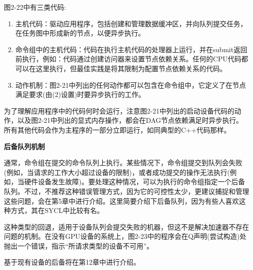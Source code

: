 图2-22中有三类代码:\par

\begin{enumerate}
	\item 主机代码：驱动应用程序，包括创建和管理数据缓冲区，并向队列提交任务，在任务图中形成新的节点，以便异步执行。
	\item 命令组中的主机代码：代码在执行主机代码的处理器上运行，并在submit返回前执行，例如：代码通过创建访问器来设置节点依赖关系。任何的CPU代码都可以在这里执行，但最佳实践是将其限制为配置节点依赖关系的代码。
	\item 动作机制：图2-21中列出的任何动作都可以包含在命令组中，它定义了在节点满足要求(由(2)设置)时要异步执行的工作。
\end{enumerate}

为了理解应用程序中的代码何时会运行，注意图2-21中列出的启动设备代码的动作，以及图2-21中列出的显式内存操作，都会在DAG节点依赖满足时异步执行。所有其他代码会作为主程序的一部分立即运行，如同典型的C++代码那样。\par

\hspace*{\fill} \par %
\textbf{后备队列机制}

通常，命令组在提交的命令队列上执行。某些情况下，命令组提交到队列会失败(例如，当请求的工作大小超过设备的限制)，或者成功提交的操作无法执行(例如，当硬件设备发生故障)。要处理这种情况，可以为执行的命令组指定一个后备队列。不过，不推荐这种错误管理方式，因为它的可控性太少，更建议捕捉和管理这些问题，会在第5章中进行介绍。这里简要介绍下后备队列，因为有些人喜欢这种方式，其在SYCL中比较有名。\par

这种类型的回退，适用于设备队列会提交失败的机器，但这不是解决加速器不存在问题的机制。在没有GPU设备的系统上，图2-23中的程序会在Q声明(尝试构造)处抛出一个错误，指示“所请求类型的设备不可用”。\par

基于现有设备的后备将在第12章中进行介绍。\par

